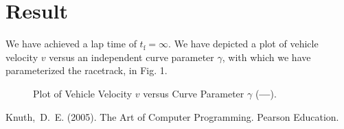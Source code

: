 \documentclass[pdf]{ifacconf}
\begin{document}
\section{Result}
We have achieved a lap time of $t_{\text{f}}=\infty$. We have depicted a plot of vehicle velocity $v$ versus an independent curve parameter $\gamma$, with which we have parameterized the racetrack, in Fig. 1. 

\begin{figure}[h] %
\begin{center}
\caption{Plot of Vehicle Velocity $v$ versus Curve Parameter $\gamma$ ({\bf\color{black}---}).}
\label{fig1}
\end{center}
\end{figure}



%

\begin{thebibliography}{3}

Knuth,~D.~E. (2005).
\newblock The Art of Computer Programming.
\newblock Pearson Education.

\end{thebibliography}

\end{document}
